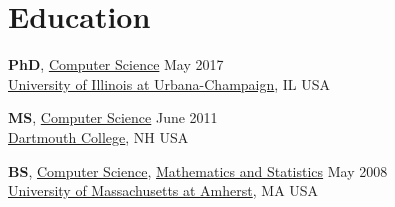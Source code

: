 
\section{\sc Education}

\textbf{PhD},
{\href{http://www.cs.illinois.edu/}{Computer Science}} \hfill May 2017 \\
{\href{http://www.illinois.edu/}{University of Illinois at Urbana-Champaign}}, IL USA \\
\vspace{-0.16cm}

\textbf{MS},
{\href{http://www.cs.dartmouth.edu/}{Computer Science}} \hfill June 2011 \\
{\href{http://www.dartmouth.edu/}{Dartmouth College}}, NH USA \\
\vspace{-0.16cm}

\textbf{BS},
{\href{http://www.cs.umass.edu/}{Computer Science}}, {\href{http://www.math.umass.edu/}{Mathematics and Statistics}}
 \hfill May 2008 \\
{\href{http://www.umass.edu/}{University of Massachusetts at Amherst}}, MA USA



%
%
